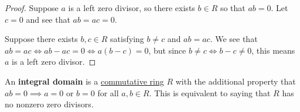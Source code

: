 \documentclass{scrartcl}
\begin{document}
\begin{proof}
    Suppose $a$ is a left zero divisor, so there exists $b\in R$ so that $ab=0$.
    Let $c=0$ and see that $ab=ac=0$.

    Suppose there exists $b,c\in R$ satisfying $b\neq c$ and $ab=ac$.
    We see that $ab=ac\iff ab-ac=0\iff a(b-c)=0$, but since $b\neq c\iff b-c\neq 0$, this means $a$ is a left zero
    divisor.
\end{proof}

\begin{definition}
    An \textbf{integral domain} is a \hyperref[def:commutative ring]{commutative ring} $R$ with the additional property
    that $ab=0\implies a=0\text{ or }b=0$ for all $a,b\in R$.
    This is equivalent to saying that $R$ has no nonzero zero divisors.
\end{definition}
\end{document}
